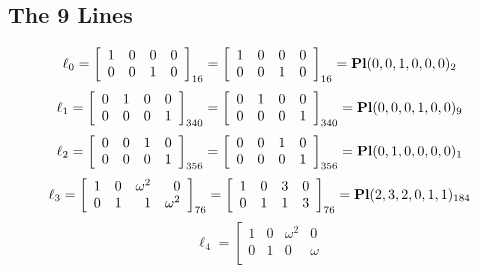 \documentclass{article}
\begin{document}
{\subsection*{The 9 Lines}
$$
\ell_{0} = 
\left[
\begin{array}{*{4}{r}}
1 & 0 & 0 & 0\\
0 & 0 & 1 & 0\\
\end{array}
\right]
_{16}
=
\left[
\begin{array}{*{4}c}
1  & 0  & 0  & 0\\
0  & 0  & 1  & 0\\
\end{array}
\right]_{16}
={\rm\bf Pl}(0,0,1,0,0,0 )_{2}$$
$$
\ell_{1} = 
\left[
\begin{array}{*{4}{r}}
0 & 1 & 0 & 0\\
0 & 0 & 0 & 1\\
\end{array}
\right]
_{340}
=
\left[
\begin{array}{*{4}c}
0  & 1  & 0  & 0\\
0  & 0  & 0  & 1\\
\end{array}
\right]_{340}
={\rm\bf Pl}(0,0,0,1,0,0 )_{9}$$
$$
\ell_{2} = 
\left[
\begin{array}{*{4}{r}}
0 & 0 & 1 & 0\\
0 & 0 & 0 & 1\\
\end{array}
\right]
_{356}
=
\left[
\begin{array}{*{4}c}
0  & 0  & 1  & 0\\
0  & 0  & 0  & 1\\
\end{array}
\right]_{356}
={\rm\bf Pl}(0,1,0,0,0,0 )_{1}$$
$$
\ell_{3} = 
\left[
\begin{array}{*{4}{r}}
1 & 0 & \omega^{2} & 0\\
0 & 1 & 1 & \omega^{2}\\
\end{array}
\right]
_{76}
=
\left[
\begin{array}{*{4}c}
1  & 0  & 3  & 0\\
0  & 1  & 1  & 3\\
\end{array}
\right]_{76}
={\rm\bf Pl}(2,3,2,0,1,1 )_{184}$$
$$
\ell_{4} = 
\left[
\begin{array}{*{4}{r}}
1 & 0 & \omega^{2} & 0\\
0 & 1 & 0 & \omega \\

\end{array}$$}
\end{document}
